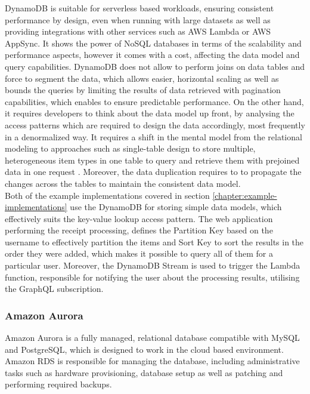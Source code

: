 DynamoDB is suitable for serverless based workloads, ensuring consistent performance by design, even when running with large datasets as well as providing integrations with other services such as AWS Lambda or AWS AppSync.
It shows the power of NoSQL databases in terms of the scalability and performance aspects, however it comes with a cost, affecting the data model and query capabilities.
DynamoDB does not allow to perform joins on data tables and force to segment the data, which allows easier, horizontal scaling as well as bounds the queries by limiting the results of data retrieved with pagination capabilities, which enables to ensure predictable performance.
On the other hand, it requires developers to think about the data model up front, by analysing the access patterns which are required to design the data accordingly, most frequently in a denormalized way.
It requires a shift in the mental model from the relational modeling to approaches such as single-table design to store multiple, heterogeneous item types in one table to query and retrieve them with prejoined data in one request \cite{SQLNoSQLandScaleHowDynamoDBScalesWhereRelationalDatabasesDont}.
Moreover, the data duplication requires to to propagate the changes across the tables to maintain the consistent data model. \\

Both of the example implementations covered in section \ref{chapter:example-implementations} use the DynamoDB for storing simple data models, which effectively suits the key-value lookup access pattern.
The web application performing the receipt processing, defines the Partition Key based on the username to effectively partition the items and Sort Key to sort the results in the order they were added, which makes it possible to query all of them for a particular user.
Moreover, the DynamoDB Stream is used to trigger the Lambda function, responsible for notifying the user about the processing results, utilising the GraphQL subscription.

\subsubsection{Amazon Aurora}

Amazon Aurora \cite{Aurora} is a fully managed, relational database compatible with MySQL and PostgreSQL, which is designed to work in the cloud based environment.
Amazon RDS is responsible for managing the database, including administrative tasks such as hardware provisioning, database setup as well as patching and performing required backups.

